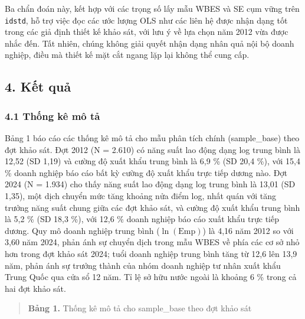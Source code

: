 \documentclass[12pt,a4paper]{article}
\begin{document}
Ba chẩn đoán này, kết hợp với các trọng số lấy mẫu WBES và SE cụm vững
trên \texttt{idstd}, hỗ trợ việc đọc các ước lượng OLS như các liên hệ
được nhận dạng tốt trong các giả định thiết kế khảo sát, với lưu ý về
lựa chọn năm 2012 vừa được nhắc đến. Tất nhiên, chúng không giải quyết
nhận dạng nhân quả nội bộ doanh nghiệp, điều mà thiết kế mặt cắt ngang
lặp lại không thể cung cấp.

\hypertarget{4-kux1ebft-quux1ea3}{%
\subsection{4. Kết quả}\label{4-kux1ebft-quux1ea3}}

\hypertarget{41-thux1ed1ng-kuxea-muxf4-tux1ea3}{%
\subsubsection{4.1 Thống kê mô
tả}\label{41-thux1ed1ng-kuxea-muxf4-tux1ea3}}

Bảng 1 báo cáo các thống kê mô tả cho mẫu phân tích chính (sample\_base)
theo đợt khảo sát. Đợt 2012 (N = 2.610) có năng suất lao động dạng log
trung bình là 12,52 (SD 1,19) và cường độ xuất khẩu trung bình là 6,9 \%
(SD 20,4 \%), với 15,4 \% doanh nghiệp báo cáo bất kỳ cường độ xuất khẩu
trực tiếp dương nào. Đợt 2024 (N = 1.934) cho thấy năng suất lao động
dạng log trung bình là 13,01 (SD 1,35), một dịch chuyển mức tăng khoảng
nửa điểm log, nhất quán với tăng trưởng năng suất chung giữa các đợt
khảo sát, và cường độ xuất khẩu trung bình là 5,2 \% (SD 18,3 \%), với
12,6 \% doanh nghiệp báo cáo xuất khẩu trực tiếp dương. Quy mô doanh
nghiệp trung bình (\(\ln(\mathrm{Emp})\)) là 4,16 năm 2012 so với 3,60
năm 2024, phản ánh sự chuyển dịch trong mẫu WBES về phía các cơ sở nhỏ
hơn trong đợt khảo sát 2024; tuổi doanh nghiệp trung bình tăng từ 12,6
lên 13,9 năm, phản ánh sự trưởng thành của nhóm doanh nghiệp tư nhân
xuất khẩu Trung Quốc qua cửa sổ 12 năm. Tỉ lệ sở hữu nước ngoài là
khoảng 6 \% trong cả hai đợt khảo sát.

\begin{quote}
\textbf{Bảng 1.} Thống kê mô tả cho sample\_base theo đợt khảo sát
\end{quote}
\end{document}
